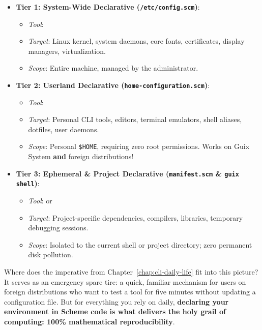 \begin{alchemybox}
\begin{itemize}
  \item \textbf{Tier 1: System-Wide Declarative (\texttt{/etc/config.scm})}:
  \begin{itemize}
    \item \emph{Tool}: 
    \item \emph{Target}: Linux kernel, system daemons, core fonts, certificates, display managers, virtualization.
    \item \emph{Scope}: Entire machine, managed by the administrator.
  \end{itemize}

  \item \textbf{Tier 2: Userland Declarative (\texttt{home-configuration.scm})}:
  \begin{itemize}
    \item \emph{Tool}: 
    \item \emph{Target}: Personal CLI tools, editors, terminal emulators, shell aliases, dotfiles, user daemons.
    \item \emph{Scope}: Personal \texttt{\$HOME}, requiring zero root permissions. Works on Guix System \textbf{and} foreign distributions!
  \end{itemize}

  \item \textbf{Tier 3: Ephemeral \& Project Declarative (\texttt{manifest.scm} \& \texttt{guix shell})}:
  \begin{itemize}
    \item \emph{Tool}:  or 
    \item \emph{Target}: Project-specific dependencies, compilers, libraries, temporary debugging sessions.
    \item \emph{Scope}: Isolated to the current shell or project directory; zero permanent disk pollution.
  \end{itemize}
\end{itemize}
\end{alchemybox}

\noindent
Where does the imperative  from Chapter~\ref{chap:cli-daily-life} fit into this picture? It serves as an emergency spare tire: a quick, familiar mechanism for users on foreign distributions who want to test a tool for five minutes without updating a configuration file. But for everything you rely on daily, \textbf{declaring your environment in Scheme code is what delivers the holy grail of computing: 100\% mathematical reproducibility}.
